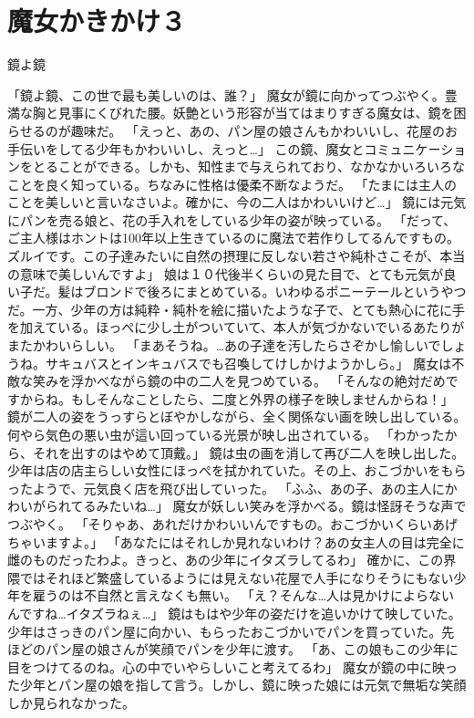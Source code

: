 \section{魔女かきかけ３}
鏡よ鏡


「鏡よ鏡、この世で最も美しいのは、誰？」
魔女が鏡に向かってつぶやく。豊満な胸と見事にくびれた腰。妖艶という形容が当てはまりすぎる魔女は、鏡を困らせるのが趣味だ。
「えっと、あの、パン屋の娘さんもかわいいし、花屋のお手伝いをしてる少年もかわいいし、えっと…」
この鏡、魔女とコミュニケーションをとることができる。しかも、知性まで与えられており、なかなかいろいろなことを良く知っている。ちなみに性格は優柔不断なようだ。
「たまには主人のことを美しいと言いなさいよ。確かに、今の二人はかわいいけど…」
鏡には元気にパンを売る娘と、花の手入れをしている少年の姿が映っている。
「だって、ご主人様はホントは100年以上生きているのに魔法で若作りしてるんですもの。ズルイです。この子達みたいに自然の摂理に反しない若さや純朴さこそが、本当の意味で美しいんですよ」
娘は１０代後半くらいの見た目で、とても元気が良い子だ。髪はブロンドで後ろにまとめている。いわゆるポニーテールというやつだ。一方、少年の方は純粋・純朴を絵に描いたような子で、とても熱心に花に手を加えている。ほっぺに少し土がついていて、本人が気づかないでいるあたりがまたかわいらしい。
「まあそうね。…あの子達を汚したらさぞかし愉しいでしょうね。サキュバスとインキュバスでも召喚してけしかけようかしら。」
魔女は不敵な笑みを浮かべながら鏡の中の二人を見つめている。
「そんなの絶対だめですからね。もしそんなことしたら、二度と外界の様子を映しませんからね！」
鏡が二人の姿をうっすらとぼやかしながら、全く関係ない画を映し出している。何やら気色の悪い虫が這い回っている光景が映し出されている。
「わかったから、それを出すのはやめて頂戴。」
鏡は虫の画を消して再び二人を映し出した。少年は店の店主らしい女性にほっぺを拭かれていた。その上、おこづかいをもらったようで、元気良く店を飛び出していった。
「ふふ、あの子、あの主人にかわいがられてるみたいね…」
魔女が妖しい笑みを浮かべる。鏡は怪訝そうな声でつぶやく。
「そりゃあ、あれだけかわいいんですもの。おこづかいくらいあげちゃいますよ。」
「あなたにはそれしか見れないわけ？あの女主人の目は完全に雌のものだったわよ。きっと、あの少年にイタズラしてるわ」
確かに、この界隈ではそれほど繁盛しているようには見えない花屋で人手になりそうにもない少年を雇うのは不自然と言えなくも無い。
「え？そんな…人は見かけによらないんですね…イタズラねぇ…」
鏡はもはや少年の姿だけを追いかけて映していた。少年はさっきのパン屋に向かい、もらったおこづかいでパンを買っていた。先ほどのパン屋の娘さんが笑顔でパンを少年に渡す。
「あ、この娘もこの少年に目をつけてるのね。心の中でいやらしいこと考えてるわ」
魔女が鏡の中に映った少年とパン屋の娘を指して言う。しかし、鏡に映った娘には元気で無垢な笑顔しか見られなかった。
